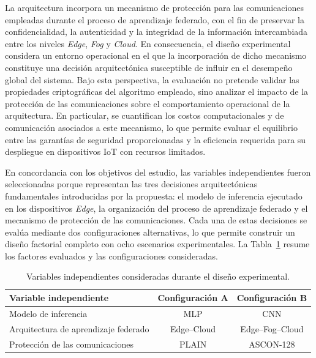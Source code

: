 \documentclass[journal,article,submit,moreauthors]{Definitions/mdpi}
\begin{document}
La arquitectura incorpora un mecanismo de protección para las comunicaciones empleadas durante el proceso de aprendizaje federado, con el fin de preservar la confidencialidad, la autenticidad y la integridad de la información intercambiada entre los niveles \textit{Edge}, \textit{Fog} y \textit{Cloud}. En consecuencia, el diseño experimental considera un entorno operacional en el que la incorporación de dicho mecanismo constituye una decisión arquitectónica susceptible de influir en el desempeño global del sistema. Bajo esta perspectiva, la evaluación no pretende validar las propiedades criptográficas del algoritmo empleado, sino analizar el impacto de la protección de las comunicaciones sobre el comportamiento operacional de la arquitectura. En particular, se cuantifican los costos computacionales y de comunicación asociados a este mecanismo, lo que permite evaluar el equilibrio entre las garantías de seguridad proporcionadas y la eficiencia requerida para su despliegue en dispositivos IoT con recursos limitados.

En concordancia con los objetivos del estudio, las variables independientes fueron seleccionadas porque representan las tres decisiones arquitectónicas fundamentales introducidas por la propuesta: el modelo de inferencia ejecutado en los dispositivos \textit{Edge}, la organización del proceso de aprendizaje federado y el mecanismo de protección de las comunicaciones. Cada una de estas decisiones se evalúa mediante dos configuraciones alternativas, lo que permite construir un diseño factorial completo con ocho escenarios experimentales. La Tabla~\ref{tab:experimental_factors} resume los factores evaluados y las configuraciones consideradas.

\begin{table}[ht]
\centering
\caption{Variables independientes consideradas durante el diseño experimental.}
\label{tab:experimental_factors}
\footnotesize
\begin{tabular}{lcc}
\toprule
\textbf{Variable independiente} & \textbf{Configuración A} & \textbf{Configuración B} \\
\midrule
Modelo de inferencia & MLP & CNN \\
Arquitectura de aprendizaje federado & Edge--Cloud & Edge--Fog--Cloud \\
Protección de las comunicaciones & PLAIN & ASCON-128 \\
\bottomrule
\end{tabular}
\end{table}
\end{document}

